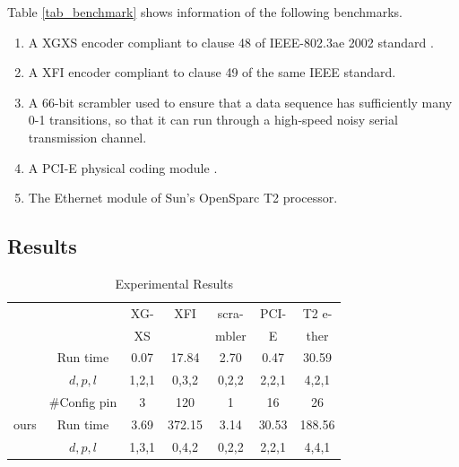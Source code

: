 \documentclass{acm_proc_article-sp}
\begin{document}
Table \ref{tab_benchmark} shows information of the following benchmarks.
\begin{enumerate}

\item A XGXS encoder compliant to clause 48 of IEEE-802.3ae 2002 standard \cite{IEEE80232002}.

\item A XFI encoder compliant to clause 49 of the same IEEE standard.

\item A 66-bit scrambler used to ensure
that a data sequence has sufficiently many 0-1 transitions, 
so that it can run through a high-speed
noisy serial transmission channel.

\item A PCI-E physical coding module \cite{PCIESPEC}.

\item The Ethernet module of Sun's OpenSparc T2 processor.
\end{enumerate}

\subsection{Results}
\begin{table}[t]
\centering
\caption{Experimental Results}
\begin{tabular}{|c|c|c|c|c|c|c|}
\hline
&                                        &XG-     &XFI       &scra-     &PCI-    &T2 e-\\
&                                        &XS      &          &mbler     &E         &ther\\\hline
\cite{ShengYuShen:fmcad10}&Run time                    &0.07     &17.84     &2.70      &0.47    &30.59       \\\cline{2-7}
&$d,p,l$                                 &1,2,1    &0,3,2     &0,2,2     &2,2,1   &4,2,1         \\ \hline\hline
&\#Config pin                              &3        &120       &1         &16      &26\\\cline{2-7}
ours&Run time                   &3.69     &372.15    &3.14      &30.53   &188.56      \\\cline{2-7}
&$d,p,l$                                 &1,3,1    &0,4,2     &0,2,2     &2,2,1   &4,4,1          \\ \hline
\end{tabular}\label{tab_res}
\end{table}
\end{document}
